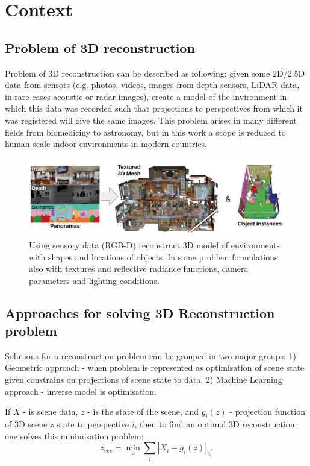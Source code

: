 \section{Context}
\subsection{Problem of 3D reconstruction}

Problem of 3D reconstruction can be described as following: given some 2D/2.5D data from sensors (e.g. photos, videos, images from depth sensors, LiDAR data, in rare cases acoustic or radar images), create a model of the invironment in which this data was recorded such that projections to perspectives from which it was registered will give the same images. This problem arises in many different fields from biomediciny to astronomy, but in this work a scope is reduced to human scale indoor environments in modern countries.

\begin{figure}
	\centering
    \includegraphics[width=\textwidth]{Figures/reconstruction_steps.png}
    \caption{Using sensory data (RGB-D) reconstruct 3D model of environments with shapes and locations of objects. In some problem formulations also with textures and reflective radiance functions, camera parameters and lighting conditions.}
    \label{fig:reconstruction_steps}
\end{figure}


\subsection{Approaches for solving 3D Reconstruction problem}

Solutions for a reconstruction problem can be grouped in two major groups: 1) Geometric approach - when problem is represented as optimisation of scene state given constrains on projections of scene state to data, 2) Machine Learning approach - inverse model is optimisation.

If $X$ - is scene data, $z$ - is the state of the scene, and $g_i(z)$ - projection function of 3D scene $z$ state to perspective $i$, then to find an optimal 3D reconstruction, one solves this minimisation problem:
\begin{equation}
z_{rec} = \min_z\sum_i|X_i-g_i(z)|_2 .
\end{equation}

